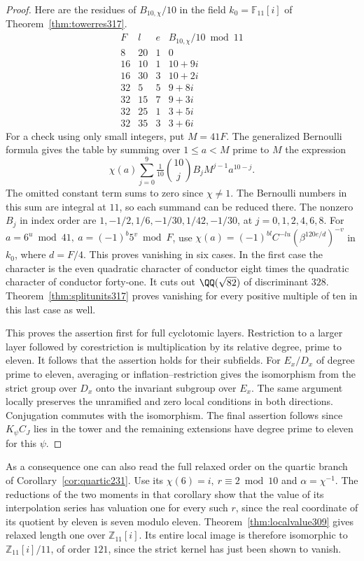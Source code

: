 \documentclass[a4paper,11pt]{article}
\theoremstyle{definition}
\theoremstyle{remark}
\newcommand{\ZZ}{\mathbb Z}\newcommand{\ord}{\operatorname{ord}}
\numberwithin{equation}{section}
\begin{document}
\begin{proof}
Here are the residues of \(B_{10,\chi}/10\) in the field
\(k_0=\mathbb F_{11}[i]\) of Theorem~\ref{thm:towerres317}.
\[
 \begin{array}{r|r|r|l}
 F&l&e&B_{10,\chi}/10\bmod11\\ \hline
 8&20&1&0\\
 16&10&1&10+9i\\
 16&30&3&10+2i\\
 32&5&5&9+8i\\
 32&15&7&9+3i\\
 32&25&1&3+5i\\
 32&35&3&3+6i
 \end{array}
\]
For a check using only small integers, put \(M=41F\).
The generalized Bernoulli formula gives the table by summing
over \(1\le a<M\) prime to \(M\) the expression
\[
 \chi(a)\sum_{j=0}^{9}
           \tfrac1{10}\binom{10}{j} B_j M^{j-1} a^{10-j}.
\]
The omitted constant term sums to zero since \(\chi\ne1\).
The Bernoulli numbers in this sum are integral at \(11\),
so each summand can be reduced there. The nonzero \(B_j\)
in index order are \(1,-1/2,1/6,-1/30,1/42,-1/30\),
at \(j=0,1,2,4,6,8\). For
\(a=6^u\bmod41,\ a=(-1)^b5^v\bmod F\), use
\(\chi(a)=(-1)^{bl}C^{-lu}(\beta^{120e/d})^{-v}\) in \(k_0\),
where \(d=F/4\). This proves vanishing in six cases. In the
first case the character is the even quadratic character of
conductor eight times the quadratic character of conductor
forty-one. It cuts out \(\QQ(\sqrt{82})\) of discriminant
\(328\). Theorem~\ref{thm:splitunits317} proves vanishing for
every positive multiple of ten in this last case as well.

This proves the assertion first for full cyclotomic layers.
Restriction to a larger layer followed by corestriction is
multiplication by its relative degree, prime to eleven. It
follows that the assertion holds for their subfields.
For \(E_x/D_x\) of degree prime to eleven, averaging or
inflation--restriction gives the isomorphism from the strict
group over \(D_x\) onto the invariant subgroup over \(E_x\).
The same argument locally preserves the unramified and zero
local conditions in both directions. Conjugation commutes
with the isomorphism. The final assertion follows since
\(K_\psi C_J\) lies in the tower and the remaining extensions
have degree prime to eleven for this \(\psi\).
\end{proof}

As a consequence one can also read the full relaxed order
on the quartic branch of Corollary~\ref{cor:quartic231}.
Use its \(\chi(6)=i,\ r\equiv2\bmod10\) and
\(\alpha=\chi^{-1}\). The reductions of the two moments in
that corollary show that the value of its interpolation
series has valuation one for every such \(r\), since the
real coordinate of its quotient by eleven is seven modulo
eleven. Theorem~\ref{thm:localvalue309} gives relaxed length
one over \(\ZZ_{11}[i]\). Its entire local image is therefore
isomorphic to \(\ZZ_{11}[i]/11\), of order \(121\), since
the strict kernel has just been shown to vanish.
\end{document}
